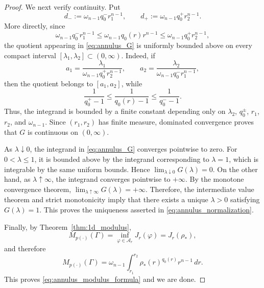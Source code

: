 \documentclass[10pt,a4paper]{amsart}
\begin{document}
\begin{proof}
We next verify continuity. Put
\begin{equation*}
d_-
:=
\omega_{n-1}q_0^-r_1^{n-1},
\qquad
d_+
:=
\omega_{n-1}q_0^+r_2^{n-1}.
\end{equation*}
More directly, since
\begin{equation*}
\omega_{n-1}q_0^-r_1^{n-1}
\le
\omega_{n-1}q_0(r)r^{n-1}
\le
\omega_{n-1}q_0^+r_2^{n-1},
\end{equation*}
the quotient appearing in \eqref{eq:annulus_G} is uniformly bounded
above on every compact interval $[\lambda_1,\lambda_2]\subset(0,\infty)$.
Indeed, if
\begin{equation*}
a_1=\frac{\lambda_1}
{\omega_{n-1}q_0^+r_2^{n-1}},
\qquad
a_2=\frac{\lambda_2}
{\omega_{n-1}q_0^-r_1^{n-1}},
\end{equation*}
then the quotient belongs to $[a_1,a_2]$, while
\begin{equation*}
\frac{1}{q_0^+-1}
\le
\frac{1}{q_0(r)-1}
\le
\frac{1}{q_0^--1}.
\end{equation*}
Thus, the integrand is bounded by a finite constant depending only on
$\lambda_2$, $q_0^\pm$, $r_1$, $r_2$, and $\omega_{n-1}$. Since
$(r_1,r_2)$ has finite measure, dominated convergence proves that
$G$ is continuous on $(0,\infty)$.

As $\lambda\downarrow0$, the integrand in \eqref{eq:annulus_G}
converges pointwise to zero. For $0<\lambda\le1$, it is bounded above by
the integrand corresponding to $\lambda=1$, which is integrable by the
same uniform bounds. Hence
$\lim_{\lambda\downarrow0}G(\lambda)=0.$
On the other hand, as $\lambda\uparrow\infty$, the integrand converges
pointwise to $+\infty$. By the monotone convergence theorem,
$\lim_{\lambda\uparrow\infty}G(\lambda)=+\infty.$
Therefore, the intermediate value theorem and strict monotonicity imply
that there exists a unique $\lambda>0$ satisfying $G(\lambda)=1$.
This proves the uniqueness asserted in \eqref{eq:annulus_normalization}.

Finally, by Theorem~\ref{thm:1d_modulus},
\begin{equation*}
M_{p(\cdot)}(\Gamma)
=
\inf_{\varphi\in\mathcal A_r}J_r(\varphi)
=
J_r(\rho_*),
\end{equation*}
and therefore
\begin{equation*}
M_{p(\cdot)}(\Gamma)
=
\omega_{n-1}
\int_{r_1}^{r_2}
\rho_*(r)^{q_0(r)}r^{n-1}\,dr.
\end{equation*}
This proves \eqref{eq:annulus_modulus_formula} and we are done.
\end{proof}
\end{document}

